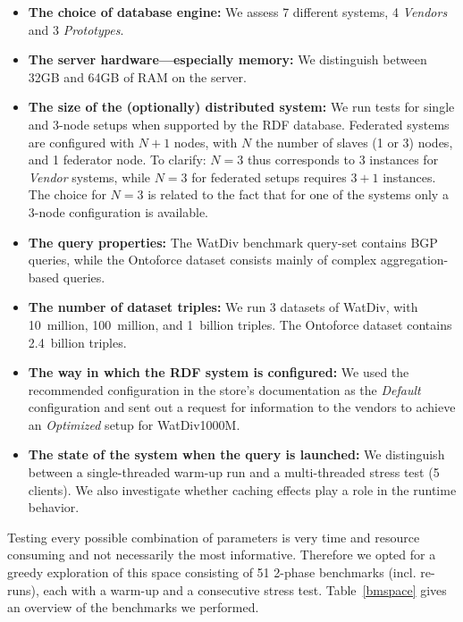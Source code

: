 \begin{itemize}
	\item \textbf{The choice of database engine:} We assess 7 different systems, 4 \emph{Vendors} and 3 \emph{Prototypes}.
	\item \textbf{The server hardware---especially memory:} We distinguish between 32GB and 64GB of RAM on the server.
	\item \textbf{The size of the (optionally) distributed system:} We run tests for single and 3-node setups when supported by the RDF database. Federated systems are configured with $N+1$ nodes, with $N$ the number of slaves (1 or 3) nodes, and 1 federator node. To clarify: $N=3$ thus corresponds to 3 instances for \emph{Vendor} systems, while $N=3$ for federated setups requires $3+1$ instances. The choice for $N=3$ is related to the fact that for one of the systems only a 3-node configuration is available.
	\item \textbf{The query properties:} The WatDiv benchmark query-set contains BGP queries, while the Ontoforce dataset consists mainly of complex aggregation-based queries.
	\item \textbf{The number of dataset triples:} We run 3 datasets of WatDiv, with 10~million, 100~million, and 1~billion triples. The Ontoforce dataset contains 2.4~billion triples.
	\item \textbf{The way in which the RDF system is configured:} We used the recommended configuration in the store's documentation as the \emph{Default} configuration and sent out a request for information to the vendors to achieve an \emph{Optimized} setup for WatDiv1000M.
	\item \textbf{The state of the system when the query is launched:} We distinguish between a single-threaded warm-up run and a multi-threaded stress test (5 clients). We also investigate whether caching effects play a role in the runtime behavior.
\end{itemize} 


Testing every possible combination of parameters is very time and resource consuming and not necessarily the most informative. Therefore we opted for a greedy exploration of this space consisting of 51 2-phase  benchmarks (incl. re-runs), each with a warm-up and a consecutive stress test. Table~\ref{bmspace} gives an overview of the benchmarks we performed.


